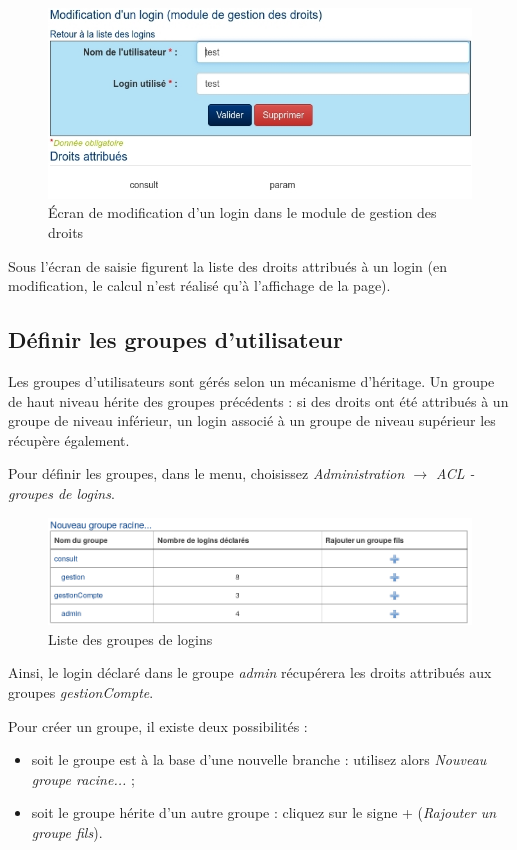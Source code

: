 \begin{figure}[H]
\includegraphics[width=\linewidth]{images/acl_login}
\caption{Écran de modification d'un login dans le module de gestion des droits}
\end{figure}


Sous l'écran de saisie figurent la liste des droits attribués à un login (en modification, le calcul n'est réalisé qu'à l'affichage de la page).

\subsection{Définir les groupes d'utilisateur}

Les groupes d'utilisateurs sont gérés selon un mécanisme d'héritage. Un groupe de haut niveau hérite des groupes précédents : si des droits ont été attribués à un groupe de niveau inférieur, un login associé à un groupe de niveau supérieur les récupère également.

Pour définir les groupes, dans le menu, choisissez \textit{Administration $\rightarrow$ ACL - groupes de logins}.

\begin{figure}[H]
\includegraphics[width=\linewidth]{images/acl_groupe.png}
\caption{Liste des groupes de logins}
\end{figure}

Ainsi, le login déclaré dans le groupe \textit{admin} récupérera les droits attribués aux groupes \textit{gestionCompte}.

Pour créer un groupe, il existe deux possibilités :
\begin{itemize}
\item soit le groupe est à la base d'une nouvelle branche : utilisez alors \textit{Nouveau groupe racine...} ;
\item soit le groupe hérite d'un autre groupe : cliquez sur le signe + (\textit{Rajouter un groupe fils}).
\end{itemize}

